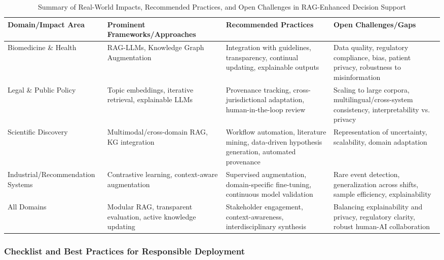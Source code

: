 \documentclass[sigconf]{acmart}
\begin{document}
\begin{table*}[htbp]
\centering
\caption{Summary of Real-World Impacts, Recommended Practices, and Open Challenges in RAG-Enhanced Decision Support}
\label{tab:vision-roadmap}
\begin{adjustbox}{max width=\textwidth}
\begin{tabular}{@{}llll@{}}
\toprule
\textbf{Domain/Impact Area} & \textbf{Prominent Frameworks/Approaches} & \textbf{Recommended Practices} & \textbf{Open Challenges/Gaps} \\
\midrule
Biomedicine \& Health & RAG-LLMs, Knowledge Graph Augmentation~\cite{ref1,ref2,ref5,ref48} & Integration with guidelines, transparency, continual updating, explainable outputs & Data quality, regulatory compliance, bias, patient privacy, robustness to misinformation~\cite{ref5,ref9,ref48} \\
Legal \& Public Policy & Topic embeddings, iterative retrieval, explainable LLMs~\cite{ref13,ref20,ref21,ref36} & Provenance tracking, cross-jurisdictional adaptation, human-in-the-loop review & Scaling to large corpora, multilingual/cross-system consistency, interpretability vs. privacy~\cite{ref36} \\
Scientific Discovery & Multimodal/cross-domain RAG, KG integration~\cite{ref12,ref15,ref19,ref24} & Workflow automation, literature mining, data-driven hypothesis generation, automated provenance & Representation of uncertainty, scalability, domain adaptation \\
Industrial/Recommendation Systems & Contrastive learning, context-aware augmentation~\cite{ref11,ref58,ref59,ref60,ref61} & Supervised augmentation, domain-specific fine-tuning, continuous model validation & Rare event detection, generalization across shifts, sample efficiency, explainability \\
All Domains & Modular RAG, transparent evaluation, active knowledge updating~\cite{ref8,ref22,ref34,ref36,ref40} & Stakeholder engagement, context-awareness, interdisciplinary synthesis & Balancing explainability and privacy, regulatory clarity, robust human-AI collaboration~\cite{ref36,ref48,ref50} \\
\bottomrule
\end{tabular}
\end{adjustbox}
\end{table*}

\subsubsection{Checklist and Best Practices for Responsible Deployment}
\end{document}
